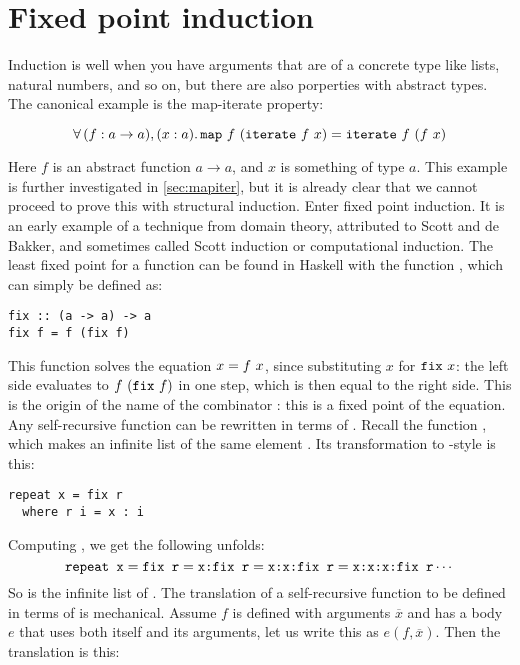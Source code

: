 \section{Fixed point induction}

Induction is well when you have arguments that are of a concrete type
like lists, natural numbers, and so on, but there are also porperties
with abstract types. The canonical example is the map-iterate property:

\begin{equation*}
\faa{(f : a \rightarrow a)}{(x : a)} \hs{map} \w f \w (\hs{iterate} \w f \w x) \eq
           \hs{iterate} \w f \w (f \w x)
\end{equation*}

Here $f$ is an abstract function $a \rightarrow a$, and $x$ is
something of type $a$. This example is further investigated in
\ref{sec:mapiter}, but it is already clear that we cannot proceed to
prove this with structural induction.  Enter fixed point induction. It
is an early example of a technique from domain theory, attributed to
Scott and de Bakker,
and sometimes called Scott induction
or computational induction.  \cite{domains} The least fixed point for
a function can be found in Haskell with the function , which
can simply be defined as:

\begin{verbatim}
fix :: (a -> a) -> a
fix f = f (fix f)
\end{verbatim}

This function solves the equation $x = f \,\, x$, since substituting $x$
for $\hs{fix} \w x$: the left side evaluates to $f \w (\hs{fix} \w f)$
in one step, which is then equal to the right side. This is the origin
of the name of the combinator : this is a fixed point of the
equation.  Any self-recursive function can be rewritten in terms of
. Recall the  function , which makes an
infinite list of the same element . Its
transformation to -style is this:

\begin{verbatim}
repeat x = fix r
  where r i = x : i
\end{verbatim}

Computing , we get the following unfolds:
\begin{equation*}
  \hs{repeat x}
= \hs{fix r}
= \hs{x:fix r}
= \hs{x:x:fix r}
= \hs{x:x:x:fix r}
  \cdots
\end{equation*}
So  is the infinite list of . The translation of a
self-recursive function to be defined in terms of  is
mechanical. Assume $f$ is defined with arguments $\overline{x}$ and
has a body $e$ that uses both itself and its arguments, let us write
this as $e(f,\overline{x})$. Then the translation is this:

